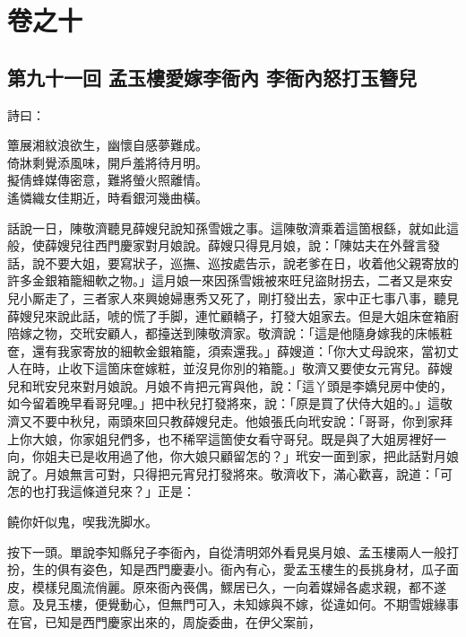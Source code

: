 \part*{{\titlename}卷之十}



\chapter*{第九十一回 孟玉樓愛嫁李衙內 李衙內怒打玉簪兒}


詩曰：

\begin{myquote}
簟展湘紋浪欲生，幽懷自感夢難成。\\倚牀剩覺添風味，開戶羞將待月明。\\擬倩蜂媒傳密意，難將螢火照離情。\\遙憐織女佳期近，時看銀河幾曲橫。
\end{myquote}

話說一日，陳敬濟聽見薛嫂兒說知孫雪娥之事。這陳敬濟乘着這箇根繇，就如此這般，使薛嫂兒往西門慶家對月娘說。薛嫂只得見月娘，說：「陳姑夫在外聲言發話，說不要大姐，要寫狀子，巡撫、巡按處告示，說老爹在日，收着他父親寄放的許多金銀箱籠細軟之物。」{}這月娘一來因孫雪娥被來旺兒盜財拐去，二者又是來安兒小厮走了，三者家人來興媳婦惠秀又死了，剛打發出去，家中正七事八事，聽見薛嫂兒來說此話，唬的慌了手脚，連忙顧轎子，打發大姐家去。但是大姐床奩箱廚陪嫁之物，交玳安顧人，都擡送到陳敬濟家。敬濟說：「這是他隨身嫁我的床帳粧奩，還有我家寄放的細軟金銀箱籠，須索還我。」薛嫂道：「你大丈母說來，當初丈人在時，止收下這箇床奩嫁粧，並沒見你別的箱籠。」敬濟又要使女元宵兒。薛嫂兒和玳安兒來對月娘說。月娘不肯把元宵與他，說：「這丫頭是李嬌兒房中使的，如今留着晚早看哥兒哩。」把中秋兒打發將來，說：「原是買了伏侍大姐的。」這敬濟又不要中秋兒，兩頭來回只教薛嫂兒走。他娘張氏向玳安說：「哥哥，你到家拜上你大娘，你家姐兒們多，也不稀罕這箇使女看守哥兒。既是與了大姐房裡好一向，你姐夫已是收用過了他，你大娘只顧留怎的？」玳安一面到家，把此話對月娘說了。月娘無言可對，只得把元宵兒打發將來。敬濟收下，滿心歡喜，說道：「可怎的也打我這條道兒來？」正是：

\begin{myquote}
饒你奸似鬼，喫我洗脚水。
\end{myquote}

按下一頭。單說李知縣兒子李衙內，自從清明郊外看見吳月娘、孟玉樓兩人一般打扮，生的俱有姿色，知是西門慶妻小。衙內有心，愛孟玉樓生的長挑身材，瓜子面皮，模樣兒風流俏麗。原來衙內䘮偶，鰥居已久，一向着媒婦各處求親，都不遂意。及見玉樓，便覺動心，但無門可入，未知嫁與不嫁，從違如何。不期雪娥緣事在官，已知是西門慶家出來的，周旋委曲，在伊父案前，

